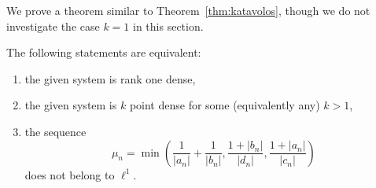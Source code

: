   We prove a theorem similar to Theorem~\ref{thm:katavolos}, though we do not investigate the case $k = 1$ in this section.
    \begin{theorem}
    \label{thm:5diag}
      The following statements are equivalent:
      \begin{enumerate}
        \item the given system is rank one dense,
        \item the given system is $k$ point dense for some (equivalently any) $k > 1$,
        \item the sequence
          \[
            \mu_n = \min\left(\frac{1}{\lvert a_n \rvert} + \frac{1}{\lvert b_n \rvert}, \frac{1 + \lvert b_n\rvert}{\lvert d_n\rvert},
                    \frac{1 + \lvert a_n\rvert}{\lvert c_n\rvert}\right)
          \]
        does not belong to $\ell^1$.
      \end{enumerate}
    \end{theorem}
